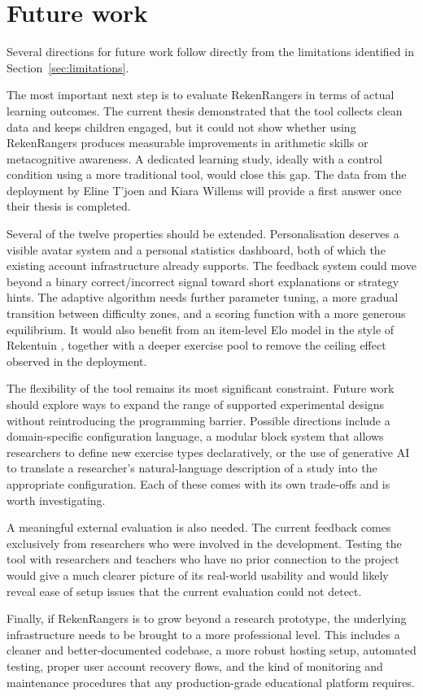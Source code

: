 \section{Future work}
\label{sec:future-work}
Several directions for future work follow directly from the limitations identified in Section~\ref{sec:limitations}.

The most important next step is to evaluate RekenRangers in terms of actual learning outcomes. The current thesis demonstrated that the tool collects clean data and keeps children engaged, but it could not show whether using RekenRangers produces measurable improvements in arithmetic skills or metacognitive awareness. A dedicated learning study, ideally with a control condition using a more traditional tool, would close this gap. The data from the deployment by Eline T'joen and Kiara Willems will provide a first answer once their thesis is completed.

Several of the twelve properties should be extended. Personalisation deserves a visible avatar system and a personal statistics dashboard, both of which the existing account infrastructure already supports. The feedback system could move beyond a binary correct/incorrect signal toward short explanations or strategy hints. The adaptive algorithm needs further parameter tuning, a more gradual transition between difficulty zones, and a scoring function with a more generous equilibrium. It would also benefit from an item-level Elo model in the style of Rekentuin \cite{klinkenberg2011computer}, together with a deeper exercise pool to remove the ceiling effect observed in the deployment.

The flexibility of the tool remains its most significant constraint. Future work should explore ways to expand the range of supported experimental designs without reintroducing the programming barrier. Possible directions include a domain-specific configuration language, a modular block system that allows researchers to define new exercise types declaratively, or the use of generative AI to translate a researcher's natural-language description of a study into the appropriate configuration. Each of these comes with its own trade-offs and is worth investigating.

A meaningful external evaluation is also needed. The current feedback comes exclusively from researchers who were involved in the development. Testing the tool with researchers and teachers who have no prior connection to the project would give a much clearer picture of its real-world usability and would likely reveal ease of setup issues that the current evaluation could not detect.

Finally, if RekenRangers is to grow beyond a research prototype, the underlying infrastructure needs to be brought to a more professional level. This includes a cleaner and better-documented codebase, a more robust hosting setup, automated testing, proper user account recovery flows, and the kind of monitoring and maintenance procedures that any production-grade educational platform requires.